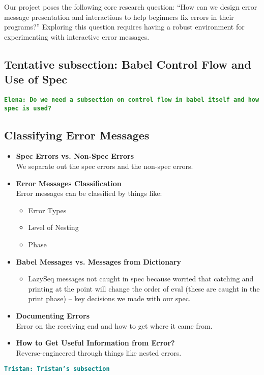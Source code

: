 \documentclass[12pt]{article}
\newcommand{\comment}[1]{{\bf \tt  {#1}}}
\newcommand{\emcomment}[1]{\textcolor{ForestGreen}{\comment{Elena: {#1}}}}
\newcommand{\tkcomment}[1]{\textcolor{Teal}{\comment{Tristan: {#1}}}}
\begin{document}
Our project poses the following core research question: 
``How can we design error message presentation and interactions to help beginners fix errors in their programs?'' 
Exploring this question requires having a robust environment for experimenting with interactive error messages.

\subsection{Tentative subsection: Babel Control Flow and Use of Spec}\label{subsec:control-flow}
\emcomment{Do we need a subsection on control flow in babel itself and how spec is used?}

\subsection{Classifying Error Messages}\label{subsec:classification}
\begin{itemize}
    \item \textbf{Spec Errors vs. Non-Spec Errors} \\
    We separate out the spec errors and the non-spec errors.

    \item \textbf{Error Messages Classification} \\
    Error messages can be classified by things like:
    \begin{itemize}
        \item Error Types
        \item Level of Nesting
        \item Phase
    \end{itemize}

    \item \textbf{Babel Messages vs. Messages from Dictionary} \\
    \begin{itemize}
        \item LazySeq messages not caught in spec because worried that catching and printing at the point will change the order of eval (these are caught in the print phase) -- key decisions we made with our spec.
    \end{itemize}

    \item \textbf{Documenting Errors} \\
    Error on the receiving end and how to get where it came from.

    \item \textbf{How to Get Useful Information from Error?} \\
    Reverse-engineered through things like nested errors.

\end{itemize}
\tkcomment{Tristan's subsection}
\end{document}
